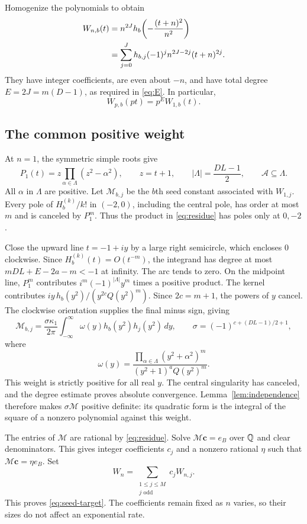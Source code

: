 Homogenize the polynomials to obtain
\begin{align}
 W_{n,b}(t)
 &=n^{2J}h_b\!\left(-\frac{(t+n)^2}{n^2}\right)\notag\\
 &=\sum_{j=0}^J h_{b,j}(-1)^j n^{2J-2j}(t+n)^{2j}.
 \label{eq:W}
\end{align}
They have integer coefficients, are even about $-n$, and
have total degree $E=2J=m(D-1)$, as required in \eqref{eq:E}.
In particular,
\begin{equation}\label{eq:homogeneity}
 W_{p,b}(pt)=p^E W_{1,b}(t).
\end{equation}

\subsection{The common positive weight}\label{sec:positive-weight}

At $n=1$, the symmetric simple roots give
\[
 P_1(t)=z\prod_{\alpha\in\Lambda}(z^2-\alpha^2),
 \qquad z=t+1,\qquad |\Lambda|=\frac{DL-1}{2},
 \qquad\mathcal A\subseteq\Lambda.
\]
All $\alpha$ in $\Lambda$ are positive. Let $\mathcal M_{b,j}$
be the $b$th seed constant associated with $W_{1,j}$.
Every pole of $H_b^{(k)}/k!$ in $(-2,0)$, including the central
pole, has order at most $m$ and is canceled by $P_1^m$.
Thus the product in \eqref{eq:residue} has poles only at $0,-2$.

Close the upward line $t=-1+iy$ by a large right semicircle,
which encloses $0$ clockwise. Since $H_b^{(k)}(t)=O(t^{-m})$,
the integrand has degree at most
$mDL+E-2a-m<-1$ at infinity. The arc tends to zero.
On the midpoint line, $P_1^m$ contributes
$i^m(-1)^{|\Lambda|}y^m$ times a positive product.
The kernel contributes
$iy\,h_b(y^2)/(y^{2c}Q(y^2)^m)$.
Since $2c=m+1$, the powers of $y$ cancel. The clockwise
orientation supplies the final minus sign, giving
\begin{equation}\label{eq:Gram}
 \mathcal M_{b,j}=\frac{\sigma\kappa_1}{2\pi}
       \int_{-\infty}^{\infty}\omega(y)h_b(y^2)h_j(y^2)\,dy,
 \qquad \sigma=(-1)^{c+(DL-1)/2+1},
\end{equation}
where
\[
 \omega(y)=\frac{\displaystyle
                   \prod_{\alpha\in\Lambda}(y^2+\alpha^2)^m}
                  {(y^2+1)^a Q(y^2)^m}.
\]
This weight is strictly positive for all real $y$.
The central singularity has canceled, and the degree estimate
proves absolute convergence. Lemma~\ref{lem:independence}
therefore makes $\sigma\mathcal M$ positive definite: its
quadratic form is the integral of the square of a nonzero
polynomial against this weight.

The entries of $\mathcal M$ are rational by \eqref{eq:residue}.
Solve $\mathcal M\mathbf c=e_B$ over $\mathbb Q$ and clear denominators.
This gives integer coefficients $c_j$ and a nonzero rational
$\eta$ such that $\mathcal M\mathbf c=\eta e_B$.
Set
\[
 W_n=\sum_{\substack{1\le j\le M\\j\text{ odd}}}c_j W_{n,j}.
\]
This proves \eqref{eq:seed-target}. The coefficients remain fixed
as $n$ varies, so their sizes do not affect an exponential rate.
